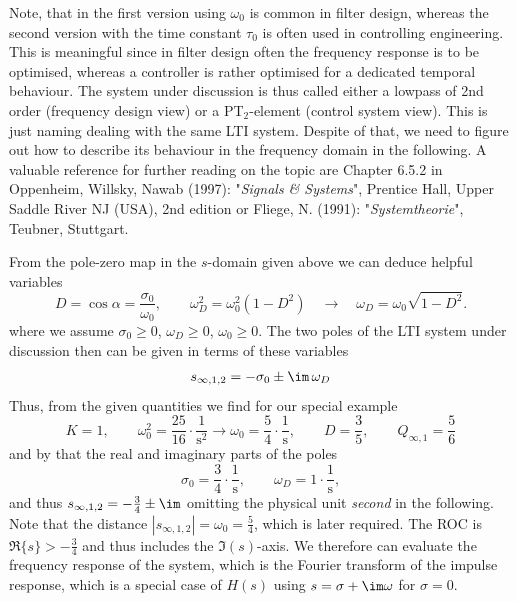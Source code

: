\begin{mdframed}
Note, that in  the first version using $\omega_0$ is
common in filter design, whereas the second version with the time
constant $\tau_0$ is often used in controlling engineering.
%
This is meaningful since in filter design often the frequency response is to be
optimised, whereas a controller is rather optimised for a dedicated
temporal behaviour.
%
The system under discussion is thus called either a lowpass of 2nd order
(frequency design view) or a PT$_2$-element (control system view).
This is just naming dealing with the same LTI system.
Despite of that, we need to figure out how to describe its behaviour in the
frequency domain in the following.
A valuable reference for further reading on the topic are Chapter 6.5.2
in Oppenheim, Willsky, Nawab (1997): "\textit{Signals \& Systems}", Prentice Hall,
Upper Saddle River NJ (USA), 2nd edition
or Fliege, N. (1991): "\textit{Systemtheorie}", Teubner, Stuttgart.
%
%
%

From the pole-zero map in the $s$-domain given above
we can deduce helpful variables
\begin{equation}
D = \cos \alpha = \frac{\sigma_0}{\omega_0},\qquad
\omega_D^2 = \omega_0^2 (1-D^2) \quad \rightarrow \quad \omega_D = \omega_0
\sqrt{1-D^2}.
\end{equation}
where we assume $\sigma_0\geq 0$, $\omega_D\geq 0$, $\omega_0\geq 0$.
%
The two poles of the LTI system under discussion then can be given in terms of
these variables
\begin{align}
s_{\infty,1,2} = -\sigma_0 \pm \im\,\omega_D
\end{align}
%
Thus, from the given quantities we find for our special example
\begin{equation}
K=1, \qquad \omega_0^2 = \frac{25}{16} \cdot \frac{1}{\text{s}^2}
\rightarrow \omega_0 = \frac{5}{4} \cdot \frac{\text{1}}{\text{s}},
\qquad D = \frac{3}{5},\qquad
Q_{\infty,1} = \frac{5}{6}
\end{equation}
and by that the real and imaginary parts of the poles
\begin{equation}
\sigma_0 = \frac{3}{4}\cdot \frac{\text{1}}{\text{s}},\qquad
\omega_D = 1 \cdot \frac{\text{1}}{\text{s}},
\end{equation}
%
and thus $s_{\infty,1,2} = -\frac{3}{4} \pm \im$
omitting the physical unit \textit{second} in the following.
%
Note that the distance $|s_{\infty,1,2}| = \omega_0=\frac{5}{4}$, which is later required.
%
The ROC is $\Re\{s\}>-\frac{3}{4}$ and thus includes the $\Im(s)$-axis.
%
We therefore can evaluate the frequency response of the system, which is the
Fourier transform of the impulse response,
which is a special case of $H(s)$ using $s=\sigma+\im\omega$ for $\sigma=0$.
\end{mdframed}







